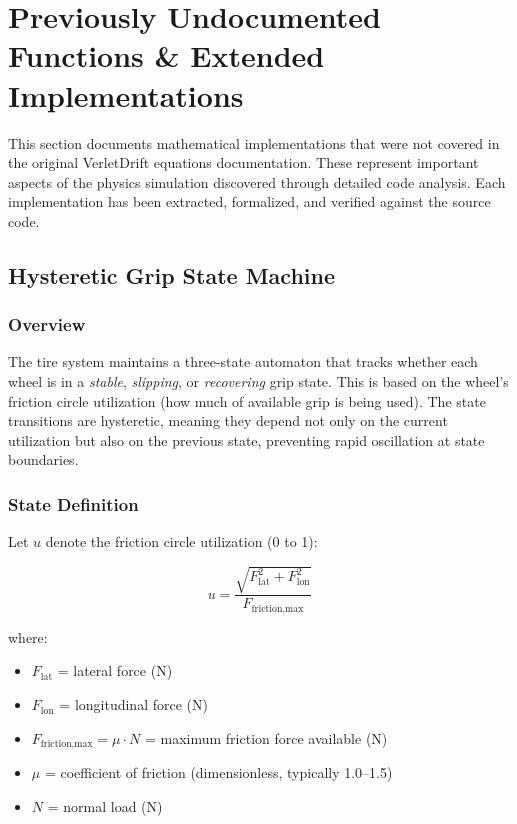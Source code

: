 \section{Previously Undocumented Functions \& Extended Implementations}

This section documents mathematical implementations that were not covered in the original VerletDrift equations documentation. These represent important aspects of the physics simulation discovered through detailed code analysis. Each implementation has been extracted, formalized, and verified against the source code.

\subsection{Hysteretic Grip State Machine}

\subsubsection*{Overview}

The tire system maintains a three-state automaton that tracks whether each wheel is in a \textit{stable}, \textit{slipping}, or \textit{recovering} grip state. This is based on the wheel's friction circle utilization (how much of available grip is being used). The state transitions are hysteretic, meaning they depend not only on the current utilization but also on the previous state, preventing rapid oscillation at state boundaries.

\subsubsection*{State Definition}

Let $u$ denote the friction circle utilization (0 to 1):

\begin{equation}
  u = \frac{\sqrt{F_{\text{lat}}^2 + F_{\text{lon}}^2}}{F_{\text{friction,max}}}
  \label{eq:friction-utilization}
\end{equation}

where:
\begin{itemize}
  \item $F_{\text{lat}}$ = lateral force (N)
  \item $F_{\text{lon}}$ = longitudinal force (N)
  \item $F_{\text{friction,max}} = \mu \cdot N$ = maximum friction force available (N)
  \item $\mu$ = coefficient of friction (dimensionless, typically 1.0–1.5)
  \item $N$ = normal load (N)
\end{itemize}

